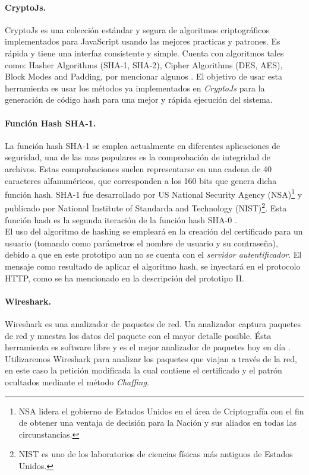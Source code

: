 \documentclass[12pt, a4paper, titlepage]{report}
\begin{document}
			\paragraph{CryptoJs. \\}
				CryptoJs es una colección estándar y segura de algoritmos criptográficos implementados para JavaScript usando las mejores practicas y patrones. Es rápida y tiene una interfaz consistente y simple. Cuenta con algoritmos tales como: Hasher Algorithms (SHA-1, SHA-2), Cipher Algorithms (DES, AES), Block Modes and Padding, por mencionar algunos \cite{refCryptoJs}. El objetivo de usar esta herramienta es usar los métodos ya implementados en \textit{CryptoJs} para la generación de código hash para una mejor y rápida ejecución del sistema.
				
				\paragraph{Función Hash SHA-1. \\}
				La función hash SHA-1 se emplea actualmente en diferentes aplicaciones de seguridad, una de las mas populares es la comprobación de integridad de archivos. Estas comprobaciones suelen representarse en una cadena de 40 caracteres alfanuméricos, que corresponden a los 160 bits que genera dicha función hash. SHA-1 fue desarrollado por US National Security Agency (NSA)\footnote{NSA lidera el gobierno de Estados Unidos en el área de Criptografía con el fin de obtener una ventaja de decisión para la Nación y sus aliados en todas las circunstancias.} y publicado por National Institute of Standarda and Technology (NIST)\footnote{NIST es uno de los laboratorios de ciencias físicas más antiguos de Estados Unidos.}. Esta función hash es la segunda iteración de la función hash SHA-0 \cite{refSHA1}.\\
				
				El uso del algoritmo de hashing se empleará en la creación del certificado para un usuario (tomando como parámetros el nombre de usuario y su contraseña), debido a que en este prototipo aun no se cuenta con el \textit{servidor autentificador}. El mensaje como resultado de aplicar el algoritmo hash, se inyectará en el protocolo HTTP, como se ha mencionado en la descripción del prototipo II.
				
				\paragraph{Wireshark. \\}
				Wireshark es una analizador de paquetes de red. Un analizador captura paquetes de red y muestra los datos del paquete con el mayor detalle posible. Ésta herramienta es software libre y es el mejor analizador de paquetes hoy en día \cite{refWireshark}. Utilizaremos Wireshark para analizar los paquetes que viajan a través de la red, en este caso la petición modificada la cual contiene el certificado y el patrón ocultados mediante el método \textit{Chaffing}.
				\label{WiresharkDefinition}
			
\end{document}
